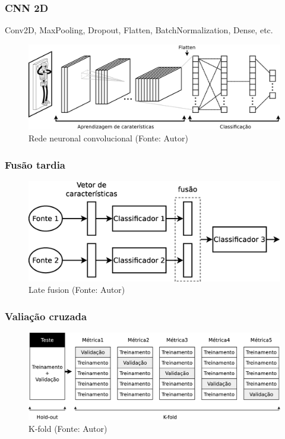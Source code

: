 \begin{frame}
    \frametitle{CNN 2D}
    Conv2D, MaxPooling, Dropout, Flatten, BatchNormalization, Dense, etc.
    \begin{figure}[h!]
    \centering
    \includegraphics[width=0.75\linewidth]{images/body-image.eps}
    \caption{Rede neuronal convolucional (Fonte: Autor)}%
    \label{fig:body-image}
    \end{figure} 
\end{frame}

\begin{frame}
    \frametitle{Fusão tardia}
    \begin{figure}[h!]
    \centering
    \includegraphics[width=0.95\linewidth]{images/fusion-late.eps}
    \caption{Late fusion (Fonte: Autor)}%
    \label{fig:fusion-late}
    \end{figure} 
\end{frame}

\begin{frame}
    \frametitle{Valiação cruzada}
    \begin{figure}[h!]
    \centering
    \includegraphics[width=0.95\linewidth]{images/kfold.eps}
    \caption{K-fold (Fonte: Autor)}%
    \label{fig:Kfold}
    \end{figure} 
\end{frame}

